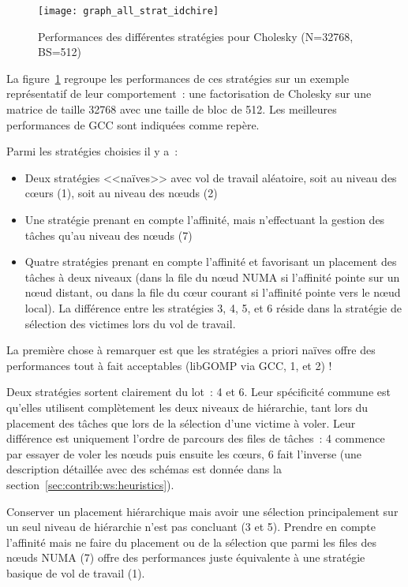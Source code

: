 \begin{figure}[ht]
  \centering
  \texttt{[image: graph\_all\_strat\_idchire]}
  \caption{Performances des différentes stratégies pour Cholesky (N=32768, BS=512)}\label{fig:contribs:perf_eval:eval-strategies}
\end{figure}

La figure~\ref{fig:contribs:perf_eval:eval-strategies} regroupe les performances de ces stratégies sur un exemple représentatif de leur comportement~: une factorisation de Cholesky sur une matrice de taille 32768 avec une taille de bloc de 512.
Les meilleures performances de GCC sont indiquées comme repère.

Parmi les stratégies choisies il y a~:
\begin{itemize}
  \item Deux stratégies <<naïves>> avec vol de travail aléatoire, soit au niveau des cœurs (1), soit au niveau des nœuds (2)
  \item Une stratégie prenant en compte l'affinité, mais n'effectuant la gestion des tâches qu'au niveau des nœuds (7)
  \item Quatre stratégies prenant en compte l'affinité et favorisant un placement des tâches à deux niveaux (dans la file du nœud NUMA si l'affinité pointe sur un nœud distant, ou dans la file du cœur courant si l'affinité pointe vers le nœud local). La différence entre les stratégies 3, 4, 5, et 6 réside dans la stratégie de sélection des victimes lors du vol de travail.
\end{itemize}

La première chose à remarquer est que les stratégies a priori naïves offre des performances tout à fait acceptables (libGOMP via GCC, 1, et 2) !

Deux stratégies sortent clairement du lot~: 4 et 6. Leur spécificité commune est qu'elles utilisent complètement les deux niveaux de hiérarchie, tant lors du placement des tâches que lors de la sélection d'une victime à voler.
Leur différence est uniquement l'ordre de parcours des files de tâches~: 4 commence par essayer de voler les nœuds puis ensuite les cœurs, 6 fait l'inverse (une description détaillée avec des schémas est donnée dans la section~\ref{sec:contrib:ws:heuristics}).

Conserver un placement hiérarchique mais avoir une sélection principalement sur un seul niveau de hiérarchie n'est pas concluant (3 et 5).
Prendre en compte l'affinité mais ne faire du placement ou de la sélection que parmi les files des nœuds NUMA (7) offre des performances juste équivalente à une stratégie basique de vol de travail (1).

